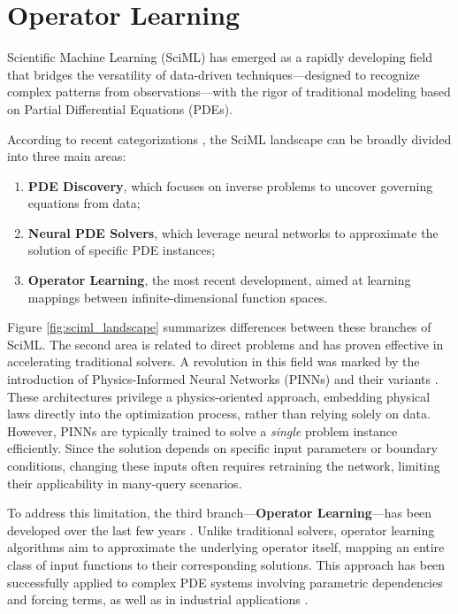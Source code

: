 \newpage
\section{Operator Learning}

Scientific Machine Learning (SciML) has emerged as a rapidly developing field that bridges the versatility of data-driven techniques—designed 
to recognize complex patterns from observations—with the rigor of traditional modeling based on Partial Differential Equations (PDEs).

According to recent categorizations \cite{boulle2023mathematical}, the SciML landscape can be broadly divided into three main areas:
\begin{enumerate}
    \item \textbf{PDE Discovery}, which focuses on inverse problems to uncover governing equations from data;
    \item \textbf{Neural PDE Solvers}, which leverage neural networks to approximate the solution of specific PDE instances;
    \item \textbf{Operator Learning}, the most recent development, aimed at learning mappings between infinite-dimensional function spaces.
\end{enumerate}

Figure \ref{fig:sciml_landscape} summarizes differences between these branches of SciML. The second area is related to direct problems and has proven effective in accelerating traditional solvers. 
\newline
A revolution in this field was marked by the introduction of Physics-Informed Neural Networks (PINNs) and their variants \cite{raissi2019physics}. 
These architectures privilege a physics-oriented approach, embedding physical laws directly into the optimization process, rather than relying solely on data.
However, PINNs are typically trained to solve a \textit{single} problem instance efficiently. Since the solution depends on specific input parameters
or boundary conditions, changing these inputs often requires retraining the network, limiting their applicability in many-query scenarios.

To address this limitation, the third branch—\textbf{Operator Learning}—has been developed over the last few years \cite{lu2021learning, li2020fourier}.
 Unlike traditional solvers, operator learning algorithms aim to approximate the underlying operator itself, 
 mapping an entire class of input functions to their corresponding solutions. This approach has been successfully applied to complex PDE systems 
 involving parametric dependencies and forcing terms, as well as in industrial applications \cite{osorio2022forecasting}.

